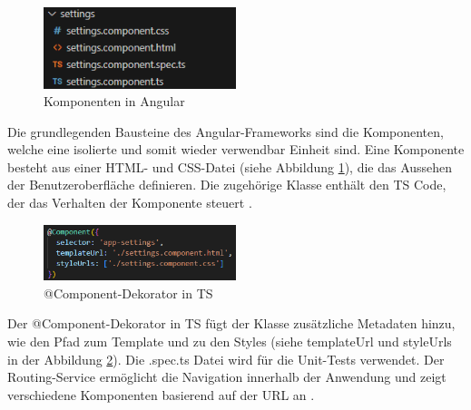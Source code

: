 \begin{figure}[h]
	\centering
	\includegraphics[width=0.5\textwidth]{images/Komponente.png}
	\caption[Komponenten in Angular]{Komponenten in Angular}
	\label{fig:KomponentenAngular}
\end{figure}
Die grundlegenden Bausteine des Angular-Frameworks sind die Komponenten, welche eine isolierte und somit wieder verwendbar Einheit sind. 
Eine Komponente besteht aus einer HTML- und CSS-Datei (siehe Abbildung \ref{fig:KomponentenAngular}), die das Aussehen der Benutzeroberfläche definieren. Die zugehörige Klasse enthält den TS Code, der das Verhalten der Komponente steuert \cite{angular_arch}.\\

\begin{figure}[h]
	\centering
	\includegraphics[width=0.5\textwidth]{images/@Component.png}
	\caption[@Component-Dekorator in TS]{@Component-Dekorator in TS}
	\label{fig:@Component}
\end{figure}
Der @Component-Dekorator in TS fügt der Klasse zusätzliche Metadaten hinzu, wie den Pfad zum Template und zu den Styles (siehe templateUrl und styleUrls in der Abbildung \ref{fig:@Component}). Die .spec.ts Datei wird für die Unit-Tests verwendet.
Der Routing-Service ermöglicht die Navigation innerhalb der Anwendung und zeigt verschiedene Komponenten basierend auf der URL an \cite{angular_arch}.\\

